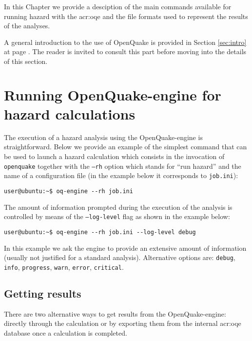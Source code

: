 In this Chapter we provide a desciption of the main commands available
for running hazard with the \gls{acr:oqe} and the file formats used to 
represent the results of the analyses.

A general introduction to the use of OpenQuake is provided in Section 
\ref{sec:intro} at page \pageref{sec:intro}.
The reader is invited to consult this part before moving into
the details of this section.
\section{Running OpenQuake-engine for hazard calculations}
The execution of a hazard analysis using the OpenQuake-engine 
is straightforward. Below we provide an example of the simplest 
command that can be used to launch a hazard calculation which 
consists in the invocation of \texttt{openquake} together with 
the \texttt{--rh} option which stands for ``run hazard'' and 
the name of a configuration file (in the example below
it corresponds to \texttt{job.ini}):
\begin{Verbatim}[frame=single, commandchars=\\\{\}, fontsize=\small]
user@ubuntu:~$ oq-engine --rh job.ini
\end{Verbatim}

The amount of information prompted during the execution of the 
analysis is controlled by means of the \texttt{--log-level} flag 
as shown in the example below:
\begin{Verbatim}[frame=single, commandchars=\\\{\}, fontsize=\small]
user@ubuntu:~$ oq-engine --rh job.ini --log-level debug
\end{Verbatim}
In this example we ask the engine to provide an extensive amount
of information (usually not justified for a standard analysis). 
Alternative options are: \texttt{debug}, \texttt{info}, \texttt{progress},
\texttt{warn}, \texttt{error}, \texttt{critical}.
\subsection{Getting results}
\label{sec:getting_results}
There are two alternative ways to get results from the OpenQuake-engine:
directly through the calculation or by exporting them from the 
internal \gls{acr:oqe} database once a calculation is completed. 

